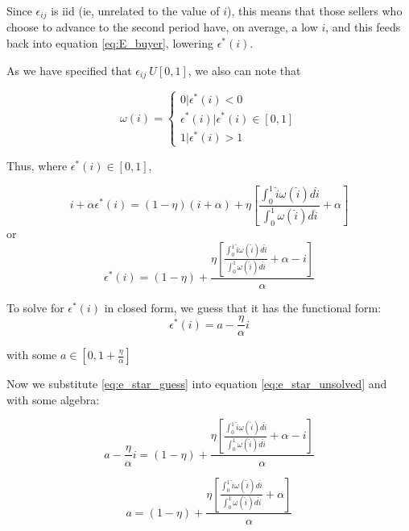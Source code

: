 \documentclass[WP]{AEA}
\begin{document}
Since $\epsilon_{ij}$ is iid (ie, unrelated to the value of $i$), this means that those sellers who choose to advance to the second period have, on average, a low $i$, and this feeds back into equation \ref{eq:E_buyer}, lowering  $\epsilon^* (i)$. 


As we have specified that $\epsilon_{ij} ~ U[0,1]$, we also can note that 

\begin{equation} \label{eq:omega_epsilon}
\omega(i) =
	\begin{cases}
		0 |  \epsilon^* (i) < 0 \\
		\epsilon^* (i) | \epsilon^* (i) \in [0,1] \\
		1 |  \epsilon^* (i) > 1
	\end{cases}
\end{equation}



Thus, where $ \epsilon^* (i) \in [0,1]$,

\begin{equation}
 i+\alpha \epsilon^*(i) = (1-\eta)(i+\alpha ) + \eta  \left[ \frac{\int_0^1 \hat{i} \omega(\hat{i}) d\hat{i}}{\int_0^1  \omega(\hat{i}) d\hat{i}} + \alpha \right] 
\end{equation}
or
\begin{equation} \label{eq:e_star_unsolved}
 \epsilon^*(i) = (1-\eta) + \frac{   \eta \left[ \frac{\int_0^1 \hat{i} \omega(\hat{i}) d\hat{i}}{\int_0^1  \omega(\hat{i}) d\hat{i}} + \alpha -i \right] }{\alpha} 
\end{equation}

To solve for $  \epsilon^*(i)$ in closed form, we guess that it has the functional form:
 \begin{equation} \label{eq:e_star_guess}
 \epsilon^*(i) = a-\frac{\eta }{\alpha}i
 \end{equation}
 
 with some  $a \in [0,1+\frac{\eta }{\alpha}]$

Now we substitute \ref{eq:e_star_guess} into equation \ref{eq:e_star_unsolved} and with some algebra:

$$a-\frac{\eta }{\alpha}i= (1-\eta) + \frac{   \eta \left[ \frac{\int_0^1 \hat{i} \omega(\hat{i}) d\hat{i}}{\int_0^1  \omega(\hat{i}) d\hat{i}} + \alpha -i \right] }{\alpha } $$

$$
a= (1-\eta) + \frac{   \eta\left[ \frac{\int_0^1 \hat{i} \omega(\hat{i}) d\hat{i}}{\int_0^1  \omega(\hat{i}) d\hat{i}} + \alpha  \right] }{\alpha} 
$$
\end{document}
